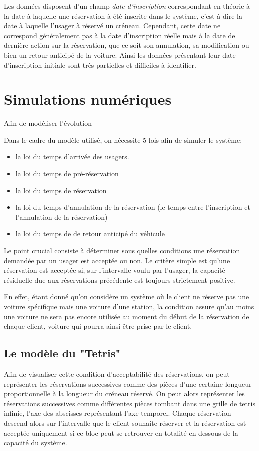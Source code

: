 \documentclass[12pt,a4paper]{article}
\newcommand{\1}[1]{\mathbbm{1}_{\{#1\}} }
\theoremstyle{definition}
\begin{document}
{Les données disposent d'un champ \emph{date d'inscription} correspondant en théorie à la date à laquelle une réservation à été inscrite dans le système, c'est à dire la date à laquelle l'usager à réservé un créneau. Cependant, cette date ne correspond généralement pas à la date d'inscription réelle mais à la date de dernière action sur la réservation, que ce soit son annulation, sa modification ou bien un retour anticipé de la voiture. Ainsi les données présentant leur  date d'inscription initiale sont très partielles et difficiles à identifier.

\section{Simulations numériques}

Afin de modéliser l'évolution 


Dans le cadre du modèle utilisé, on nécessite 5 lois afin de simuler le système:
\begin{itemize}
\item la loi du temps d'arrivée des usagers.
\item la loi du temps de pré-réservation
\item la loi du temps de réservation
\item la loi du temps d'annulation de la réservation (le temps entre l'inscription et l'annulation de la réservation)
\item la loi du temps de de retour anticipé du véhicule
\end{itemize}

Le point crucial consiste à déterminer sous quelles conditions une réservation demandée par un usager est acceptée ou non.  Le critère simple est qu'une réservation est acceptée si, sur l'intervalle voulu par l'usager, la capacité résiduelle due aux réservations précédente est toujours strictement positive.

En effet, étant donné qu'on considère un système où le client ne réserve pas une voiture spécifique mais une voiture d'une station, la condition assure qu'au moins une voiture ne sera pas encore utilisée au moment du début de la réservation de chaque client, voiture qui pourra ainsi être prise par le client.


\subsection{Le modèle du "Tetris"}

Afin de visualiser cette condition d'acceptabilité des réservations, on peut représenter les réservations successives comme des pièces d'une certaine longueur proportionnelle à la longueur du créneau réservé. On peut alors représenter les réservations successives comme différentes pièces tombant dans une grille de tetris infinie, l'axe des abscisses représentant l'axe temporel.
Chaque réservation descend alors sur l'intervalle que  le client souhaite réserver et la réservation est acceptée uniquement si ce bloc peut se retrouver en totalité en dessous de la capacité du système.

}
\end{document}
